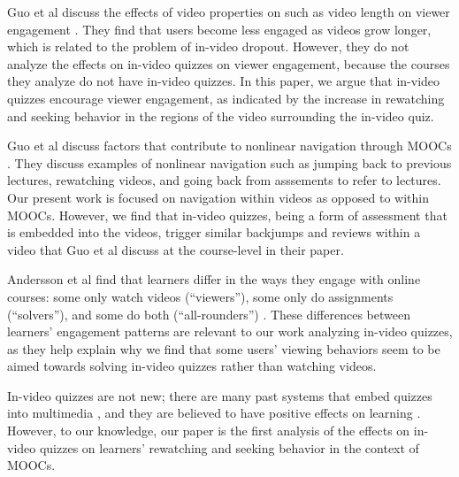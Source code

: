 \documentclass{sigchi}
\begin{document}
Guo et al discuss the effects of video properties on such as video length on viewer engagement \cite{guovideo}. They find that users become less engaged as videos grow longer, which is related to the problem of in-video dropout. However, they do not analyze the effects on in-video quizzes on viewer engagement, because the courses they analyze do not have in-video quizzes. In this paper, we argue that in-video quizzes encourage viewer engagement, as indicated by the increase in rewatching and seeking behavior in the regions of the video surrounding the in-video quiz.

Guo et al discuss factors that contribute to nonlinear navigation through MOOCs \cite{guodemographics}. They discuss examples of nonlinear navigation such as jumping back to previous lectures, rewatching videos, and going back from asssements to refer to lectures. Our present work is focused on navigation within videos as opposed to within MOOCs. However, we find that in-video quizzes, being a form of assessment that is embedded into the videos, trigger similar backjumps and reviews within a video that Guo et al discuss at the course-level in their paper.

Andersson et al find that learners differ in the ways they engage with online courses: some only watch videos (``viewers''), some only do assignments (``solvers''), and some do both (``all-rounders'') \cite{ashton}. These differences between learners' engagement patterns are relevant to our work analyzing in-video quizzes, as they help explain why we find that some users' viewing behaviors seem to be aimed towards solving in-video quizzes rather than watching videos.


In-video quizzes are not new; there are many past systems that embed quizzes into multimedia \cite{multimedia}, and they are believed to have positive effects on learning \cite{embedded}. However, to our knowledge, our paper is the first analysis of the effects on in-video quizzes on learners' rewatching and seeking behavior in the context of MOOCs.
\end{document}
